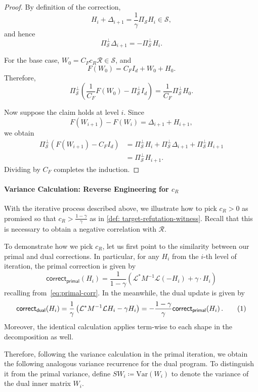 \documentclass[12pt]{article}
\newcommand{\Var}{\mathrm{Var}}
\newcommand{\calR}{\mathcal{R}}
\newcommand{\calS}{\mathcal{S}}
\newcommand\numberthis{\addtocounter{equation}{1}\tag{\theequation}}
\newcommand{\gam}{\gamma}
\newcommand{\corr}{\mathsf{correct}}
\newcommand{\calL}{\mathcal{L}}
\begin{document}
\begin{proof}
By definition of the correction,
\[
    H_i+\Delta_{i+1}
    =
    \frac{1}{\gamma}\Pi_{\calS}H_i
    \in\calS,
\]
and hence
\[
    \Pi_{\calS}^{\perp}\Delta_{i+1}
    =
    -\Pi_{\calS}^{\perp}H_i.
\]

For the base case, \(W_0=C_Fc_R\calR\in\calS\), and
\[
    F(W_0)=C_FI_d+W_0+H_0.
\]
Therefore,
\[
    \Pi_{\calS}^{\perp}
    \left(
        \frac{1}{C_F}F(W_0)-\Pi_{\calS}^{\perp}I_d
    \right)
    =
    \frac{1}{C_F}\Pi_{\calS}^{\perp}H_0.
\]

Now suppose the claim holds at level \(i\). Since
\[
    F(W_{i+1})-F(W_i)
    =
    \Delta_{i+1}+H_{i+1},
\]
we obtain
\begin{align*}
    \Pi_{\calS}^{\perp}
    \left(
        F(W_{i+1})-C_FI_d
    \right)
    &=
    \Pi_{\calS}^{\perp}H_i
    +\Pi_{\calS}^{\perp}\Delta_{i+1}
    +\Pi_{\calS}^{\perp}H_{i+1}\\
    &=
    \Pi_{\calS}^{\perp}H_{i+1}.
\end{align*}
Dividing by \(C_F\) completes the induction.
\end{proof}


\paragraph{Variance Calculation: Reverse Engineering for $c_R$} With the iterative process described above, we illustrate how to pick $c_R >0 $ as promised so that $c_R > \frac{1-\gamma}{\gamma}$ as in \cref{def: target-refutation-witness}. Recall that this is necessary to obtain a negative correlation with $\calR$.

To demonstrate how we pick $c_R$, let us first point to the similarity between our primal and dual corrections. In particular, for any $H_i$ from the $i$-th level of iteration, the primal correction is given by \[ 
\corr_{\mathsf{primal}}(H_i) =   \frac{1}{1-\gamma} \left(\calL^*M^{-1} \calL(-H_{i} ) + \gam \cdot H_{i}     \right) 
\]
recalling from~\cref{eq:primal-corr}. In the meanwhile, the dual update is given by \[ 
\corr_{\mathsf{dual}}(H_i) = \frac{1}{\gamma} \left(\calL^*M^{-1}\calL H_{i}- \gamma  H_{i} \right)  = -\frac{1-\gamma}{\gamma}  \corr_{\mathsf{primal}}(H_i)\,.  \numberthis \label{eq:primal-dual-correction} \]
Moreover, the identical calculation applies term-wise to each shape in the decomposition as well.

Therefore, following the variance calculation in the primal iteration, we obtain the following analogous variance recurrence for the dual program. To distinguish it from the primal variance, define $SW_i \coloneqq \Var(W_i)$ to denote the variance of the dual inner matrix $W_i$.
\end{document}
